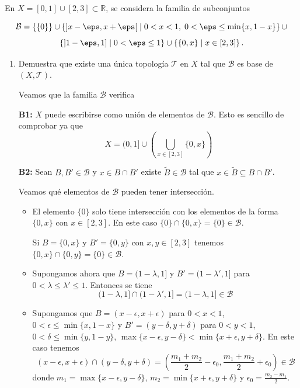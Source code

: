 \documentclass[12pt]{article}
\begin{document}
    \newpage
    \setcounter{ejercicio}{0} %
    \noindent

        \begin{ejercicio}
        En $X = \left[0, 1\right] \cup \left[2, 3\right] \subset \mathbb{R}$, se considera la familia de subconjuntos
        
        $$\mathcal{B} = \{\{0\}\} \cup \left\{ \left]x - \eps, x + \eps\right[ \;\middle|\; 0 < x < 1,\; 0 < \eps \leq \min\{x, 1 - x\} \right\} \cup $$ 
        $$\left\{ \left]1 - \eps, 1\right] \;\middle|\; 0 < \eps \leq 1 \right\} \cup \left\{ \{0, x\} \;\middle|\; x \in \left[2, 3\right] \right\}.$$
        
        \begin{enumerate}[label=\alph*)]
            \item Demuestra que existe una única topología $\mathcal{T}$ en $X$ tal que $\mathcal{B}$ es base de $(X, \mathcal{T})$.

                Veamos que la familia $\mathcal{B}$ verifica
    
                \textbf{B1:} $X$ puede escribirse como unión de elementos de $\mathcal{B}$. Esto es sencillo de comprobar ya que
                \[
                X=(0,1]\cup\left(\bigcup_{x\in[2,3]}\{0,x\}\right)
                \]
        
                \textbf{B2:} Sean $B, B'\in\mathcal{B}$ y $x\in B\cap B'$ existe $\tilde{B}\in\mathcal{B}$ tal que $x\in\tilde{B}\subseteq B\cap B'$.
    
                Veamos qué elementos de $\mathcal{B}$ pueden tener intersección.
                \begin{itemize}[leftmargin=*]
                    \item El elemento $\{0\}$ solo tiene intersección con los elementos de la forma $\{0,x\}$ con $x\in[2,3]$. En este caso $\{0\}\cap\{0,x\}=\{0\}\in\mathcal{B}$.
                    
                    Si $B=\{0,x\}$ y $B'=\{0,y\}$ con $x,y\in[2,3]$ tenemos $\{0,x\}\cap\{0,y\}=\{0\}\in\mathcal{B}$.
                    
                    \item Supongamos ahora que $B=(1-\lambda,1]$ y $B'=(1-\lambda',1]$ para $0<\lambda\le\lambda'\le 1$. Entonces se tiene
                    \[
                    (1-\lambda,1]\cap(1-\lambda',1]=(1-\lambda,1]\in\mathcal{B}
                    \]
        
                    \item Supongamos que $B=(x-\epsilon,x+\epsilon)$ para $0<x<1$, $0<\epsilon\le \min\{x,1-x\}$ y $B'=(y-\delta,y+\delta)$ para $0<y<1$, $0<\delta\le \min\{y,1-y\}$, $\max\{x-\epsilon,y-\delta\}<\min\{x+\epsilon,y+\delta\}$. En este caso tenemos
                    \[
                    (x-\epsilon,x+\epsilon)\cap(y-\delta,y+\delta)=\left(\frac{m_1+m_2}{2}-\epsilon_0,\frac{m_1+m_2}{2}+\epsilon_0\right)\in\mathcal{B}
                    \]
                    donde $m_1=\max\{x-\epsilon,y-\delta\}$, $m_2=\min\{x+\epsilon,y+\delta\}$ y $\epsilon_0 = \frac{m_2-m_1}{2}$.
        

\end{itemize}
\end{enumerate}
\end{ejercicio}
\end{document}
